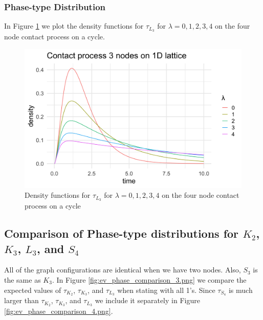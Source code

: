 \subsubsection{Phase-type Distribution}

In Figure \ref{fig:lattice_3_contact_phase_densities} we plot the density functions for $\tau_{L_3}$ for $\lambda = 0, 1, 2, 3, 4$ on the four node contact process on a cycle.

\begin{figure}[H]
  \centering
    \includegraphics[width=.80\textwidth]{figures/lattice_3_contact_phase_densities.png}
   \caption{Density functions for $\tau_{L_3}$ for $\lambda = 0, 1, 2, 3, 4$ on the four node contact process on a cycle}
  \label{fig:lattice_3_contact_phase_densities}
\end{figure}

\subsection{Comparison of Phase-type distributions for \texorpdfstring{$K_2$}{K2}, \texorpdfstring{$K_3$}{K3}, \texorpdfstring{$L_3$}{L3}, and \texorpdfstring{$S_4$}{S4}}

All of the graph configurations are identical when we have two nodes.
Also, $S_3$ is the same as $K_3$.
In Figure \ref{fig:ev_phase_comparison_3.png} we compare the expected values of $\tau_{K_2}$, $\tau_{K_3}$, and $\tau_{L_3}$ when stating with all 1's.
Since $\tau_{S_4}$ is much larger than $\tau_{K_2}$, $\tau_{K_3}$, and $\tau_{L_3}$ we include it separately in Figure \ref{fig:ev_phase_comparison_4.png}.

